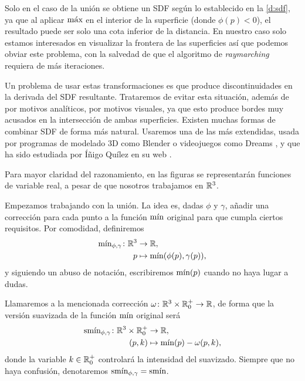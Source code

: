 \begin{observacion}
    Solo en el caso de la unión se obtiene un SDF según lo establecido en la \autoref{d:sdf}, ya que al aplicar $\Max$ en el interior de la superficie (donde $\phi(p) < 0$), el resultado puede ser solo una cota inferior de la distancia. En nuestro caso solo estamos interesados en visualizar la frontera de las superficies así que podemos obviar este problema, con la salvedad de que el algoritmo de \textit{raymarching} requiera de más iteraciones.
\end{observacion}

Un problema de usar estas transformaciones es que produce discontinuidades en la derivada del SDF resultante. Trataremos de evitar esta situación, además de por motivos analíticos, por motivos visuales, ya que esto produce bordes muy acusados en la intersección de ambas superficies. Existen muchas formas de combinar SDF de forma más natural. Usaremos una de las más extendidas, usada por programas de modelado 3D como Blender \cite{repo:blender} o videojuegos como Dreams \cite{game:dreams}, y que ha sido estudiada por Íñigo Quílez en su web \cite{article:smooth}.

\begin{observacion}
    Para mayor claridad del razonamiento, en las figuras se representarán funciones de variable real, a pesar de que nosotros trabajamos en $\R^3$.
\end{observacion}

Empezamos trabajando con la unión. La idea es, dadas $\phi$ y $\gamma$, añadir una corrección para cada punto a la función $\Min$ original para que cumpla ciertos requisitos. Por comodidad, definiremos 
\begin{align*}
      \Min_{\phi,\gamma}\colon \R^3 &\to \R,\\
      p &\mapsto \Min(\phi(p),\gamma(p)),
\end{align*}
y siguiendo un abuso de notación, escribiremos $\Min(p)$ cuando no haya lugar a dudas.

Llamaremos a la mencionada corrección $\omega\colon \R^3\times \R^+_0\to\R$, de forma que la versión suavizada de la función $\Min$ original será
\begin{align*}
      \smin_{\phi,\gamma}\colon \R^3\times \R^+_0 &\to \R,\\
      (p,k) &\mapsto \Min(p) - \omega(p,k),
\end{align*}
donde la variable $k\in\R^+_0$ controlará la intensidad del suavizado. Siempre que no haya confusión, denotaremos $\smin_{\phi,\gamma} = \smin$.\newline

